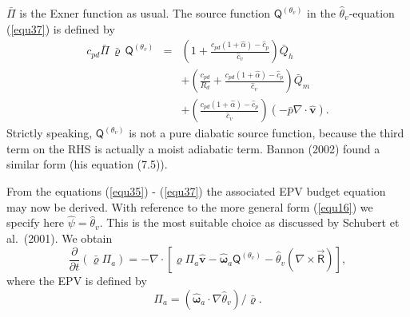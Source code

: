$\bar{\Pi}$ is the Exner function as usual.
The source function $\mathsf{Q}^{\left(\theta_v\right)}$ in the $\hat{\theta}_v$-equation (\ref{equ37}) is defined by 
\begin{eqnarray}
c_{pd}\bar{\Pi}\,\bar{\varrho}\,\mathsf{Q}^{\left( \theta_v\right)}&=&
  \left( 1 + \frac{c_{pd}(1+\hat{\alpha})-\hat{c}_p}{\hat{c}_v}\right)  \bar{Q}_h\nonumber\\
&&+ \left( \frac{c_{pd}}{R_d} + \frac{c_{pd}(1+\hat{\alpha})-\hat{c}_p}{\hat{c}_v}\right)\bar{Q}_m  \nonumber\\
&&+ \left(\frac{c_{pd}(1+\hat{\alpha})-\hat{c}_p}{\hat{c}_v} \right) \left(- \bar{p} \nabla \cdot \hat{\mathbf{v}} \right).\label{equ42}
\end{eqnarray}
Strictly speaking, $\mathsf{Q}^{\left(\theta_v\right)}$ is not a pure diabatic source function, because the third term on
the RHS is actually a moist adiabatic term. Bannon (2002) found a similar form (his equation (7.5)).

From the equations (\ref{equ35}) - (\ref{equ37}) the associated EPV budget equation may now be derived. With reference to the more general form (\ref{equ16}) we specify here $\hat{\psi}=\hat{\theta}_v$. This is the most suitable choice as
discussed by Schubert et al.~(2001).
We obtain
\begin{equation}
\frac{\partial}{\partial t}\left( \bar{\varrho} \Pi_a\right)=
-\nabla \cdot \left[\hat{\varrho} \Pi_a \hat{\mathbf{v}} -\hat{\boldsymbol{\omega}}_a \mathsf{Q}^{\left( \theta_v\right) }- \hat{\theta}_v \left(\nabla \times \vec{\mathsf{R}} \right)\right],\label{equ43}
\end{equation}
where the EPV is defined by
\begin{equation}
\Pi_a = (\hat{\boldsymbol{\omega}}_a \cdot \nabla \hat{\theta}_v)/\bar{\varrho}. \label{equ44}
\end{equation} 



